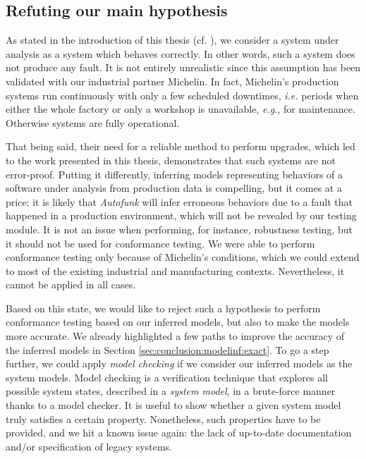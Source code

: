 
\subsection{Refuting our main hypothesis}
\label{sec:conclusion:testing:valid}

As stated in the introduction of this thesis (cf.
), we consider a system
under analysis as a system which behaves correctly. In other
words, such a system does not produce any fault. It is not
entirely unrealistic since this assumption has been validated
with our industrial partner Michelin. In fact, Michelin's
production systems run continuously with only a few scheduled
downtimes, \emph{i.e.} periods when either the whole factory or only a
workshop is unavailable, \emph{e.g.}, for maintenance. Otherwise systems
are fully operational.

That being said, their need for a reliable method to perform
upgrades, which led to the work presented in this thesis,
demonstrates that such systems are not error-proof. Putting it
differently, inferring models representing behaviors of a
software under analysis from production data is compelling, but
it comes at a price: it is likely that \textit{Autofunk} will
infer erroneous behaviors due to a fault that happened in a
production environment, which will not be revealed by our testing
module. It is not an issue when performing, for instance,
robustness testing, but it should not be used for conformance
testing. We were able to perform conformance testing only because
of Michelin's conditions, which we could extend to most of the
existing industrial and manufacturing contexts. Nevertheless, it
cannot be applied in all cases.

Based on this state, we would like to reject such a hypothesis to
perform conformance testing based on our inferred models, but
also to make the models more accurate. We already highlighted a
few paths to improve the accuracy of the inferred models in
Section \ref{sec:conclusion:modelinf:exact}. To go a step
further, we could apply \emph{model checking}
\cite{baier2008principles} if we consider our inferred models as
the system models. Model checking is a verification technique
that explores all possible system states, described in a
\textit{system model}, in a brute-force manner thanks to a model
checker. It is useful to show whether a given system model truly
satisfies a certain property.  Nonetheless, such properties have
to be provided, and we hit a known issue again: the lack of
up-to-date documentation and/or specification of legacy systems.
